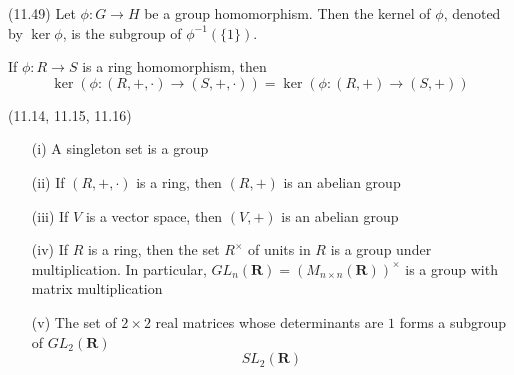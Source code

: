 \begin{defi}
(11.49) Let $\phi :G\rightarrow H$ be a group homomorphism. Then the kernel of $\phi $, denoted by $\mathop{\mathrm{ker}}\phi $, is the subgroup of $\phi ^{-1}(\{1\})$. 
\end{defi}
\vspace{2ex}
\begin{rmk}
If $\phi :R\rightarrow S$ is a ring homomorphism, then
\[\mathop{\mathrm{ker}}(\phi :(R,+,\cdot )\rightarrow (S,+,\cdot ))=\mathop{\mathrm{ker}}(\phi :(R,+)\rightarrow (S,+))\]
\end{rmk}
\vspace{2ex}
\begin{ex}
(11.14, 11.15, 11.16)
\begin{itemize}
\item[(i)] A singleton set is a group
\item[(ii)] If $(R,+,\cdot )$ is a ring, then $(R,+)$ is an abelian group
\item[(iii)] If $V$ is a vector space, then $(V,+)$ is an abelian group
\item[(iv)] If $R$ is a ring, then the set $R^{\times }$ of units in $R$ is a group under multiplication. In particular, $GL_{n}({\bm R})=(M_{n\times n}({\bm R}))^{\times }$ is a group with matrix multiplication
\item[(v)] The set of $2\times 2$ real matrices whose determinants are $1$ forms a subgroup of $GL_{2}({\bm R})$
\[SL_{2}({\bm R})\]
\end{itemize}
\end{ex}
\vspace{2ex}

